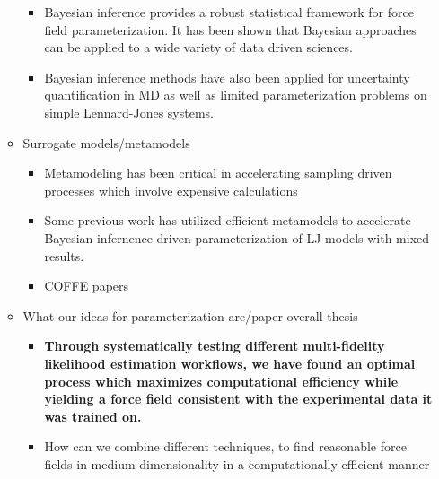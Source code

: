 \documentclass[aps,pre,nofootinbib,superscriptaddress,linenumbers,10pt, draft,tightenlines]{revtex4-1}
\begin{document}
\begin{itemize}
\begin{itemize}
\begin{itemize}
    		\item Bayesian inference provides a robust statistical framework for force field parameterization. 
    		      It has been shown that Bayesian approaches can be applied to a wide variety of data driven sciences.
    		      \cite{bayes1,bayes2,bayes3,bayes5,bayes6,bayes7,bayes8,bayes_coarse} 
    		\item Bayesian inference methods have also been applied for uncertainty quantification in MD as well as limited parameterization
    		      problems on simple Lennard-Jones systems. \cite{bayes4,UQMDrizzi,LJexpBayes}
    	\end{itemize}
        \item Surrogate models/metamodels
        \begin{itemize}
        	\item Metamodeling has been critical in accelerating sampling driven processes which involve expensive calculations \cite{mbar}
        	\item Some previous work has utilized efficient metamodels to accelerate Bayesian infernence driven parameterization of LJ models with mixed results. \cite{LJexpBayes}
    	    \item COFFE papers \cite{COFFE2016}    	    
        \end{itemize}    
        \item What our ideas for parameterization are/paper overall thesis
        \begin{itemize}
        	\item \textbf{Through systematically testing different multi-fidelity likelihood estimation workflows, we have found an optimal process which 
        	      maximizes computational efficiency while yielding a force field consistent with the experimental data it was trained on.}
            \item How can we combine different techniques, to find reasonable force fields in medium dimensionality in a computationally efficient manner
            
        \end{itemize}    
    \end{itemize}
\end{itemize}
\end{document}

